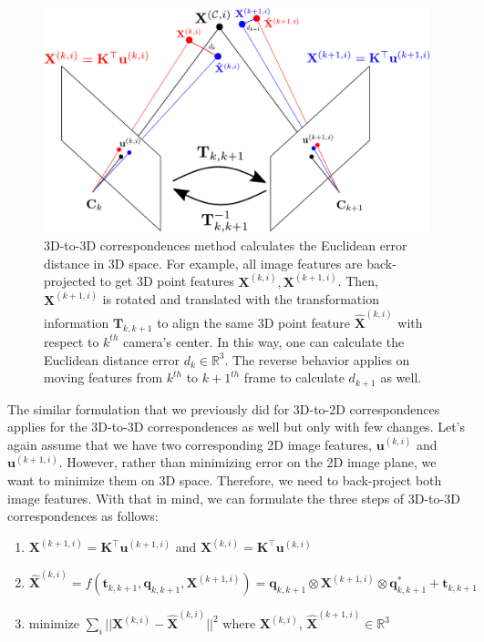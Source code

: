 \documentclass[12pt]{report}
\numberwithin{figure}{section}
\newcommand{\R}{\mathbb{R}}
\begin{document}
\begin{figure}[H]
	\centering
	\includegraphics[width=0.9\linewidth,natwidth=640,natheight=640]
	{fig/drawings/3d_to_3d.pdf}
	\caption[3D-to-3D Correspondences]
	{3D-to-3D correspondences method calculates the Euclidean error distance 
	in 
	3D space. For example, all image features are 
	back-projected to get 3D point features 
	$\mathbf{X}^{(k,i)},\mathbf{X}^{(k+1,i)}$. Then, $\mathbf{X}^{(k+1,i)}$ is 
	rotated and translated with the transformation information 
	$\mathbf{T}_{k,k+1}$ to align the same 3D point feature 
	$\mathbf{\hat{X}}^{(k,i)}$ with respect to $k^{th}$ camera's center. In 
	this 
	way, one can calculate the Euclidean distance error $d_k \in \R^3$. 
	The reverse 
	behavior applies on moving features from $k^{th}$ to $k+1^{th}$ frame to 
	calculate $d_{k+1}$ as well.}
	\label{fig:min_euclidean_error}
\end{figure}


The similar formulation that we previously did for 3D-to-2D correspondences 
applies for the 3D-to-3D correspondences as well but only with few changes. 
Let's again assume that we have two corresponding 2D image features, 
$\mathbf{u}^{(k,i)}$ and $\mathbf{u}^{(k+1,i)}$. However, rather than 
minimizing error on the 2D image plane, we want to minimize them on 3D space. 
Therefore, we need to back-project both image features. With that in mind, we 
can formulate the three steps of 3D-to-3D correspondences as follows:

\begin{enumerate}
  \item $\mathbf{X}^{(k+1,i)} = \mathbf{K}^\top \mathbf{u}^{(k+1,i)}$ and 
    $\mathbf{X}^{(k,i)} = \mathbf{K}^\top \mathbf{u}^{(k,i)}$ 
  \item $\mathbf{\hat{X}}^{(k,i)} = f(\mathbf{t}_{k,k+1}, \mathbf{q}_{k,k+1}, 
  \mathbf{X}^{(k+1,i)}) = 
    \mathbf{q}_{k,k+1} \otimes \mathbf{X}^{(k+1,i)} \otimes 
    \mathbf{q}_{k,k+1}^* + \mathbf{t}_{k,k+1}$
  \item minimize $\sum_i||\mathbf{X}^{(k,i)} - \mathbf{\hat{X}}^{(k,i)}||^2$ 
  where $\mathbf{X}^{(k,i)}$, $\mathbf{\hat{X}}^{(k+1,i)} \in \R^3$

\end{enumerate}
\end{document}
